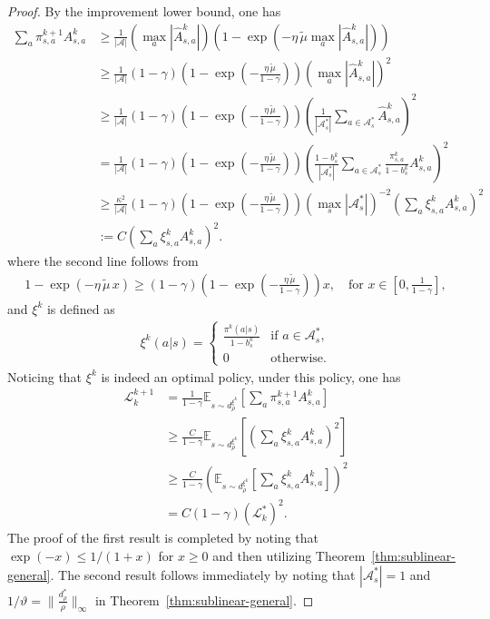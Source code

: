 \begin{proof}
    By the improvement lower bound, one has 
\begin{align*}
\sum_a\pi^{k+1}_{s,a}A^k_{s,a}&\geq \frac{1}{|\mathcal{A}|}\left(\max_a|\hat{A}^k_{s,a}|\right)
\left(1-\exp\left(-\eta\,\tilde{\mu}\max_a|\hat{A}^k_{s,a}|\right)\right)\\
&\geq \frac{1}{|\mathcal{A}|}(1-\gamma)\left(1-\exp\left(-\frac{\eta\,\tilde{\mu}}{1-\gamma}\right)\right)\left(\max_a|\hat{A}^k_{s,a}|\right)^2\\
&\geq \frac{1}{|\mathcal{A}|}(1-\gamma)\left(1-\exp\left(-\frac{\eta\,\tilde{\mu}}{1-\gamma}\right)\right)\left(\frac{1}{|\mathcal{A}_s^*|}\sum_{a\in\mathcal{A}_s^*}\hat{A}^k_{s,a}\right)^2\\
&=\frac{1}{|\mathcal{A}|}(1-\gamma)\left(1-\exp\left(-\frac{\eta\,\tilde{\mu}}{1-\gamma}\right)\right)\left(\frac{1-b_s^k}{|\mathcal{A}_s^*|}\sum_{a\in\mathcal{A}_s^*}\frac{\pi^k_{s,a}}{1-b_s^k}{A}^k_{s,a}\right)^2\\
&\geq \frac{\kappa^2}{|\mathcal{A}|}(1-\gamma)\left(1-\exp\left(-\frac{\eta\,\tilde{\mu}}{1-\gamma}\right)\right)\left(\max_s|\mathcal{A}_s^*|\right)^{-2}\left(\sum_{a}\xi^k_{s,a}{A}^k_{s,a}\right)^2\\
&:=C\left(\sum_{a}\xi^k_{s,a}{A}^k_{s,a}\right)^2.
\end{align*}
where the second line follows from
\begin{align*}
1-\exp\left(-\eta\,\tilde{\mu}\,x\right)\geq (1-\gamma)\left(1-\exp\left(-\frac{\eta\,\tilde{\mu}}{1-\gamma}\right)\right)x,\quad\mbox{for }x\in\left[0,\frac{1}{1-\gamma}\right],
\end{align*}
and $\xi^k$ is defined as 
\begin{align*}
\xi^k(a|s)=\begin{cases}
\frac{\pi^k(a|s)}{1-b_s^k}& \mbox{if }a\in\mathcal{A}_s^*,\\
0 &\mbox{otherwise}.
\end{cases}
\end{align*}
Noticing that $\xi^k$ is indeed an optimal policy, under this policy, one has 
\begin{align*}
\mathcal{L}_k^{k+1} &= \frac{1}{1-\gamma}\mathbb{E}_{s\sim d_\rho^{\xi^k}}\left[\sum_a\pi^{k+1}_{s,a}A^k_{s,a}\right]\\
&\geq \frac{C}{1-\gamma}\mathbb{E}_{s\sim d_\rho^{\xi^k}}\left[\left(\sum_{a}\xi^k_{s,a}{A}^k_{s,a}\right)^2\right]\\
&\geq \frac{C}{1-\gamma}\left(\mathbb{E}_{s\sim d_\rho^{\xi^k}}\left[\sum_{a}\xi^k_{s,a}{A}^k_{s,a}\right]\right)^2\\
&=C(1-\gamma)\left(\mathcal{L}_k^*\right)^2.
\end{align*}
The proof of the first result is completed by noting that $\exp(-x)\leq 1/(1+x)$ for $x\geq 0$ and then utilizing Theorem~\ref{thm:sublinear-general}. The second result follows immediately by noting that $|\mathcal{A}_s^*|=1$ and $1/\vartheta=\|\frac{d_\rho^*}{\rho}\|_\infty$ in Theorem~\ref{thm:sublinear-general}.
\end{proof}


